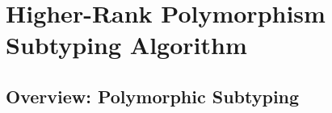 \chapter{Higher-Rank Polymorphism Subtyping Algorithm}
\label{chap:ITP}



\section{Overview: Polymorphic Subtyping}











